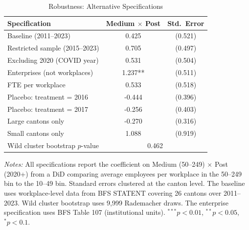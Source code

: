 \begin{table}[t]
\centering
\caption{Robustness: Alternative Specifications}
\label{tab:robustness}
\begin{threeparttable}
\begin{tabular}{lcc}
\toprule
Specification & Medium $\times$ Post & Std.\ Error \\
\midrule
Baseline (2011--2023) & 0.425 & (0.521) \\
Restricted sample (2015--2023) & 0.705 & (0.497) \\
Excluding 2020 (COVID year) & 0.531 & (0.504) \\
Enterprises (not workplaces) & 1.237** & (0.511) \\
FTE per workplace & 0.533 & (0.518) \\
\midrule
Placebo: treatment = 2016 & -0.444 & (0.396) \\
Placebo: treatment = 2017 & -0.256 & (0.403) \\
\midrule
Large cantons only & -0.270 & (0.316) \\
Small cantons only & 1.088 & (0.919) \\
\midrule
Wild cluster bootstrap $p$-value & \multicolumn{2}{c}{0.462} \\
\bottomrule
\end{tabular}
\begin{tablenotes}[flushleft]\footnotesize
\item \textit{Notes:} All specifications report the coefficient on Medium (50--249) $\times$ Post (2020+)
from a DiD comparing average employees per workplace in the 50--249 bin to the 10--49 bin.
Standard errors clustered at the canton level. The baseline uses workplace-level data from
BFS STATENT covering 26 cantons over 2011--2023. Wild cluster bootstrap uses 9,999 Rademacher draws.
The enterprise specification uses BFS Table 107 (institutional units). $^{***}p<0.01$, $^{**}p<0.05$, $^{*}p<0.1$.
\end{tablenotes}
\end{threeparttable}
\end{table}
